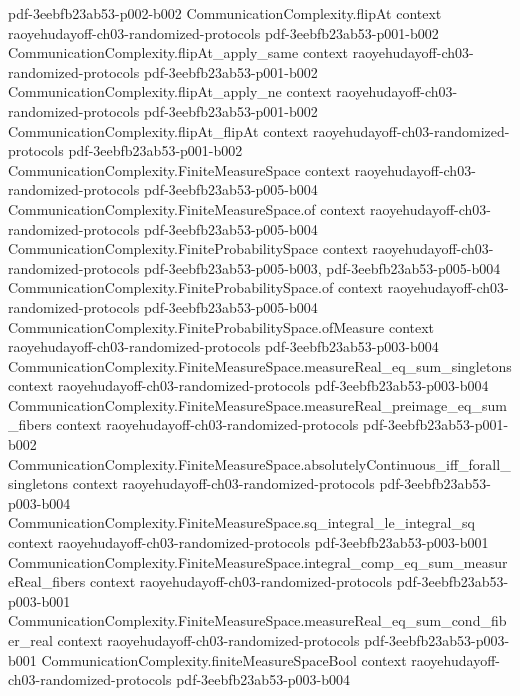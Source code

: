 \begin{theorem}
  {pdf-3eebfb23ab53-p002-b002}
\proofstep
  {CommunicationComplexity.flipAt}
  {context}
  {raoyehudayoff-ch03-randomized-protocols}
  {pdf-3eebfb23ab53-p001-b002}
\proofstep
  {CommunicationComplexity.flipAt_apply_same}
  {context}
  {raoyehudayoff-ch03-randomized-protocols}
  {pdf-3eebfb23ab53-p001-b002}
\proofstep
  {CommunicationComplexity.flipAt_apply_ne}
  {context}
  {raoyehudayoff-ch03-randomized-protocols}
  {pdf-3eebfb23ab53-p001-b002}
\proofstep
  {CommunicationComplexity.flipAt_flipAt}
  {context}
  {raoyehudayoff-ch03-randomized-protocols}
  {pdf-3eebfb23ab53-p001-b002}
\proofstep
  {CommunicationComplexity.FiniteMeasureSpace}
  {context}
  {raoyehudayoff-ch03-randomized-protocols}
  {pdf-3eebfb23ab53-p005-b004}
\proofstep
  {CommunicationComplexity.FiniteMeasureSpace.of}
  {context}
  {raoyehudayoff-ch03-randomized-protocols}
  {pdf-3eebfb23ab53-p005-b004}
\proofstep
  {CommunicationComplexity.FiniteProbabilitySpace}
  {context}
  {raoyehudayoff-ch03-randomized-protocols}
  {pdf-3eebfb23ab53-p005-b003,
    pdf-3eebfb23ab53-p005-b004}
\proofstep
  {CommunicationComplexity.FiniteProbabilitySpace.of}
  {context}
  {raoyehudayoff-ch03-randomized-protocols}
  {pdf-3eebfb23ab53-p005-b004}
\proofstep
  {CommunicationComplexity.FiniteProbabilitySpace.ofMeasure}
  {context}
  {raoyehudayoff-ch03-randomized-protocols}
  {pdf-3eebfb23ab53-p003-b004}
\proofstep
  {CommunicationComplexity.FiniteMeasureSpace.measureReal_eq_sum_singletons}
  {context}
  {raoyehudayoff-ch03-randomized-protocols}
  {pdf-3eebfb23ab53-p003-b004}
\proofstep
  {CommunicationComplexity.FiniteMeasureSpace.measureReal_preimage_eq_sum_fibers}
  {context}
  {raoyehudayoff-ch03-randomized-protocols}
  {pdf-3eebfb23ab53-p001-b002}
\proofstep
  {CommunicationComplexity.FiniteMeasureSpace.absolutelyContinuous_iff_forall_singletons}
  {context}
  {raoyehudayoff-ch03-randomized-protocols}
  {pdf-3eebfb23ab53-p003-b004}
\proofstep
  {CommunicationComplexity.FiniteMeasureSpace.sq_integral_le_integral_sq}
  {context}
  {raoyehudayoff-ch03-randomized-protocols}
  {pdf-3eebfb23ab53-p003-b001}
\proofstep
  {CommunicationComplexity.FiniteMeasureSpace.integral_comp_eq_sum_measureReal_fibers}
  {context}
  {raoyehudayoff-ch03-randomized-protocols}
  {pdf-3eebfb23ab53-p003-b001}
\proofstep
  {CommunicationComplexity.FiniteMeasureSpace.measureReal_eq_sum_cond_fiber_real}
  {context}
  {raoyehudayoff-ch03-randomized-protocols}
  {pdf-3eebfb23ab53-p003-b001}
\proofstep
  {CommunicationComplexity.finiteMeasureSpaceBool}
  {context}
  {raoyehudayoff-ch03-randomized-protocols}
  {pdf-3eebfb23ab53-p003-b004}

\end{theorem}

